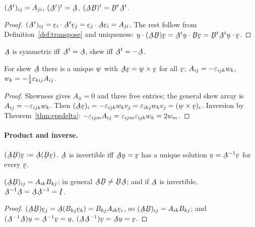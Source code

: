 \begin{proposition}\label{prop:transpose}
$(\bA^{t})_{ij}=A_{ji}$, $(\bA^{t})^{t}=\bA$, $(\bA\bB)^{t}=\bB^{t}\bA^{t}$.
\end{proposition}

\begin{proof}
$(\bA^{t})_{ij}=\ip{\be_{i}}{\bA^{t}\be_{j}}=\ip{\be_{j}}{\bA\be_{i}}
=A_{ji}$. The rest follow from Definition~\ref{def:transpose} and
uniqueness: $\ip\bu{(\bA\bB)\bv}=\ip{\bA^{t}\bu}{\bB\bv}
=\ip{\bB^{t}\bA^{t}\bu}\bv$.
\end{proof}

\begin{definition}\label{def:symskew}
$\bA$ is symmetric iff $\bA^{t}=\bA$, skew iff $\bA^{t}=-\bA$.
\end{definition}

\begin{proposition}\label{prop:axial}
For skew $\bA$ there is a unique $\bw$ with $\bA\bv=\bw\times\bv$ for all
$\bv$; $A_{ij}=-\varepsilon_{ijk}w_{k}$, $w_{k}=-\tfrac12\varepsilon_{kij}A_{ij}$.
\end{proposition}

\begin{proof}
Skewness gives $A_{ii}=0$ and three free entries; the general skew array is
$A_{ij}=-\varepsilon_{ijk}w_{k}$. Then
$(\bA\bv)_{i}=-\eps_{ijk}w_{k}v_{j}=\eps_{ikj}w_{k}v_{j}
=(\bw\times\bv)_{i}$. Inversion by Theorem~\ref{thm:epsdelta}:
$-\varepsilon_{ijm}A_{ij}=\varepsilon_{ijm}\varepsilon_{ijk}w_{k}=2w_{m}$.
\end{proof}

\paragraph*{Product and inverse.}

\begin{definition}\label{def:prodinv}
$(\bA\bB)\bv:=\bA(\bB\bv)$. $\bA$ is invertible iff $\bA\bu=\bv$ has a
unique solution $\bu=\bA^{-1}\bv$ for every $\bv$.
\end{definition}

\begin{proposition}\label{prop:prodinv}
$(\bA\bB)_{ij}=A_{ik}B_{kj}$; in general $\bA\bB\neq\bB\bA$; and if $\bA$ is
invertible, $\bA^{-1}\bA=\bA\bA^{-1}=\I$.
\end{proposition}

\begin{proof}
$(\bA\bB)\be_{j}=\bA(B_{kj}\be_{k})=B_{kj}A_{ik}\be_{i}$, so
$(\bA\bB)_{ij}=A_{ik}B_{kj}$; and
$(\bA^{-1}\bA)\bu=\bA^{-1}\bv=\bu$, $(\bA\bA^{-1})\bv=\bA\bu=\bv$.
\end{proof}

